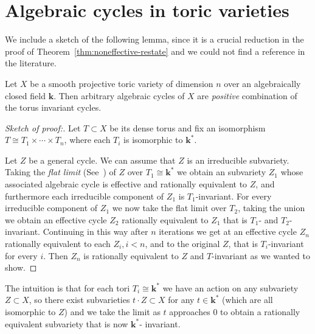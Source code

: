 \documentclass[ALCO,ThmDefs,Unicode,epreuves]{cedram}
\renewcommand{\k}{\mathbf{k}}
\begin{document}
\appendix 
\section{Algebraic cycles in toric varieties} 

We include a sketch of the following lemma, since it is a crucial reduction in the proof of Theorem~\ref{thm:noneffective-restate} and we could not find a reference in the literature.
\begin{lemm}\label{lem:aux}
	Let $X$ be a smooth projective toric variety of dimension $n$ over an algebraically closed field $\k$. Then arbitrary algebraic cycles of $X$ are \emph{positive} combination of the torus invariant cycles.
\end{lemm}

\begin{proof}[Sketch of proof:]
	Let $T\subset X$ be its dense torus and fix an isomorphism $T\cong T_1\times\cdots\times T_n$, where each $T_i$ is isomorphic to $\k^*$.
	
	Let $Z$ be a general cycle. We can assume that $Z$ is an irreducible subvariety. Taking the \emph{flat limit} (See~\cite[Section~II.3.4]{schemes}) of $Z$ over $T_1\cong \k^*$ we obtain an subvariety $Z_1$ whose associated algebraic cycle is effective and rationally equivalent to $Z$, and furthermore each irreducible component of $Z_1$ is $T_1$-invariant. For every irreducible component of $Z_1$ we now take the flat limit over $T_2$, taking the union we obtain an effective cycle $Z_2$ rationally equivalent to $Z_1$ that is $T_1$- and $T_2$-invariant. Continuing in this way after $n$ iterations we get at an effective cycle $Z_n$ rationally equivalent to each $Z_i, i<n$, and to the original $Z$, that is $T_i$-invariant for every $i$. Then $Z_n$ is rationally equivalent to $Z$ and $T$-invariant as we wanted to show.
\end{proof}

The intuition is that for each tori $T_i\cong\boldsymbol{k}^*$ we have an action on any subvariety $Z\subset X$, so there exist subvarieties $t\cdot Z\subset X$ for any $t\in\k^*$ (which are all isomorphic to $Z$) and we take the limit as $t$ approaches $0$ to obtain a rationally equivalent subvariety that is now $\k^*$- invariant.
\end{document}
